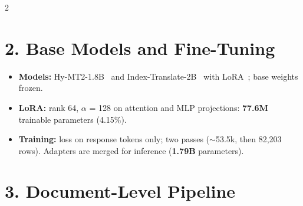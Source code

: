 \documentclass[a0,portrait]{a0poster}
\newcommand{\psec}[1]{\section*{\fontsize{46}{52}\selectfont\color{NavyBlue}#1}}  %
\begin{document}
\begin{multicols}{2}
\psec{2. Base Models and Fine-Tuning}

\begin{itemize}
\item \textbf{Models:} Hy-MT2-1.8B~\cite{zheng2026hymt2} and Index-Translate-2B~\cite{indexteam} with LoRA~\cite{hu2022lora}; base weights frozen.
\item \textbf{LoRA:} rank 64, $\alpha$ = 128 on attention and MLP projections: \textbf{77.6M} trainable parameters (4.15\%).
\item \textbf{Training:} loss on response tokens only; two passes ($\sim$53.5k, then 82,203 rows). Adapters are merged for inference (\textbf{1.79B} parameters).
\end{itemize}

\columnbreak

\psec{3. Document-Level Pipeline}


\end{multicols}
\end{document}

